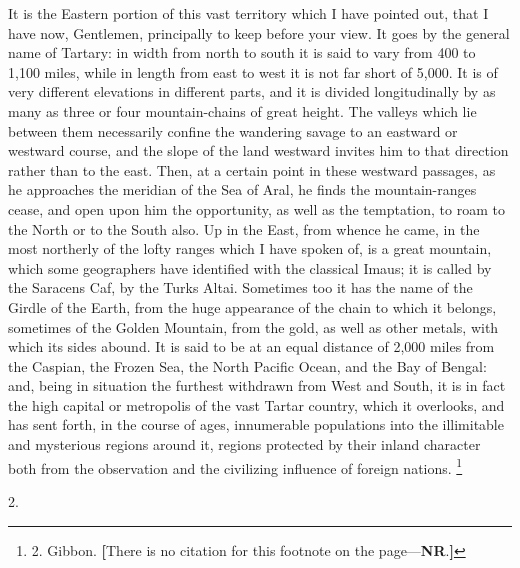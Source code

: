 It is the Eastern portion of
this vast territory which I have pointed out, that I have now,
Gentlemen, principally to keep before your view. It goes by the
general name of Tartary: in width from north to south it is said to
vary from 400 to 1,100 miles, while in length from east to west it is
not far short of 5,000. It is of very different elevations in
different parts, and it is divided longitudinally by as many as three
or four mountain-chains of great height. The valleys which lie between
them necessarily confine the wandering savage to an eastward or
westward course, and the slope of the land westward invites him to
that direction rather than to the east. Then, at a certain point in
these westward passages, as he approaches the meridian of the Sea of
Aral, he finds the mountain-ranges cease, and open upon him the
opportunity, as well as the temptation, to roam to the North or to the
South also. Up in the East, from whence he came, in the most northerly
of the lofty ranges which I have spoken of, is a great mountain, which
some geographers have identified with the classical Imaus; it is
called by the Saracens Caf, by the Turks Altai. Sometimes too it has
the name of the Girdle of the Earth, from the huge appearance of the
chain to which it belongs, sometimes of the Golden Mountain, from
the gold, as well as other metals, with which its sides abound. It is
said to be at an equal distance of 2,000 miles from the Caspian, the
Frozen Sea, the North Pacific Ocean, and the Bay of Bengal: and, being
in situation the furthest withdrawn from West and South, it is in fact
the high capital or metropolis of the vast Tartar country, which it
overlooks, and has sent forth, in the course of ages, innumerable
populations into the illimitable and mysterious regions around it,
regions protected by their inland character both from the observation
and the civilizing influence of foreign nations. \footnote{2.
Gibbon. \textbf{[}There is no citation
for this footnote on the page—\textbf{NR}.\textbf{]}}

2.

